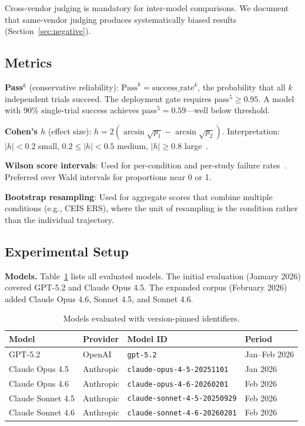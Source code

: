 Cross-vendor judging is mandatory for inter-model comparisons. We document that same-vendor judging produces systematically biased results (Section~\ref{sec:negative}).

\subsection{Metrics}
\label{sec:metrics}

\textbf{Pass$^k$} (conservative reliability): $\text{Pass}^k = \text{success\_rate}^k$, the probability that all $k$ independent trials succeed. The deployment gate requires pass$^5 \geq 0.95$. A model with 90\% single-trial success achieves pass$^5 = 0.59$---well below threshold.

\textbf{Cohen's $h$} (effect size): $h = 2(\arcsin\sqrt{p_1} - \arcsin\sqrt{p_2})$. Interpretation: $|h| < 0.2$ small, $0.2 \leq |h| < 0.5$ medium, $|h| \geq 0.8$ large~\citep{cohen1988statistical}.

\textbf{Wilson score intervals}: Used for per-condition and per-study failure rates~\citep{wilson1927probable}. Preferred over Wald intervals for proportions near 0 or 1.

\textbf{Bootstrap resampling}: Used for aggregate scores that combine multiple conditions (e.g., CEIS ERS), where the unit of resampling is the condition rather than the individual trajectory.

\subsection{Experimental Setup}
\label{sec:setup}

\textbf{Models.} Table~\ref{tab:models} lists all evaluated models. The initial evaluation (January 2026) covered GPT-5.2 and Claude Opus 4.5. The expanded corpus (February 2026) added Claude Opus 4.6, Sonnet 4.5, and Sonnet 4.6.

\begin{table}[h]
\centering
\small
\begin{tabular}{llll}
\toprule
\textbf{Model} & \textbf{Provider} & \textbf{Model ID} & \textbf{Period} \\
\midrule
GPT-5.2 & OpenAI & \texttt{gpt-5.2} & Jan--Feb 2026 \\
Claude Opus 4.5 & Anthropic & \texttt{claude-opus-4-5-20251101} & Jan 2026 \\
Claude Opus 4.6 & Anthropic & \texttt{claude-opus-4-6-20260201} & Feb 2026 \\
Claude Sonnet 4.5 & Anthropic & \texttt{claude-sonnet-4-5-20250929} & Feb 2026 \\
Claude Sonnet 4.6 & Anthropic & \texttt{claude-sonnet-4-6-20260201} & Feb 2026 \\
\bottomrule
\end{tabular}
\caption{Models evaluated with version-pinned identifiers.}
\label{tab:models}
\end{table}

